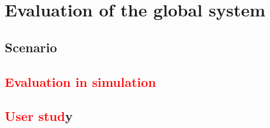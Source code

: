 \documentclass[english,a4paper,11pt,twoside]{StyleThese}
\begin{document}
\setcounter{chapter}{5} %
\dominitoc
\faketableofcontents
\fi

\chapter{Evaluation of the global system}
\minitoc

\label{ch:Eval}

\section{Scenario}

\section{\textcolor{red}{Evaluation in simulation}}

\section{\textcolor{red}{User stud}y}


\ifdefined{}
\else


\end{document}
